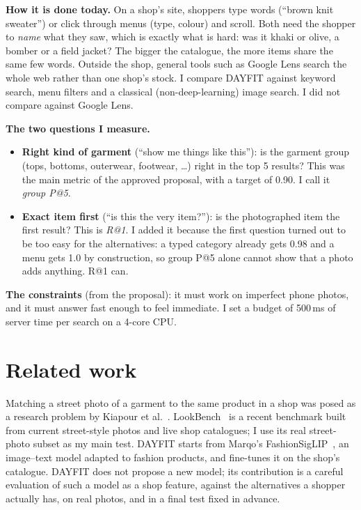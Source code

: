 \documentclass[11pt,a4paper]{article}
\begin{document}
\textbf{How it is done today.} On a shop's site, shoppers type words (``brown knit sweater'') or click
through menus (type, colour) and scroll. Both need the shopper to \emph{name} what they saw, which is exactly
what is hard: was it khaki or olive, a bomber or a field jacket? The bigger the catalogue, the more items share
the same few words. Outside the shop, general tools such as Google Lens search the whole web rather than one
shop's stock. I compare DAYFIT against keyword search, menu filters and a classical (non-deep-learning)
image search. I did not compare against Google Lens.

\textbf{The two questions I measure.}
\begin{itemize}
\item \textbf{Right kind of garment} (``show me things like this''): is the garment group (tops, bottoms,
  outerwear, footwear, \dots) right in the top 5 results? This was the main metric of the approved proposal,
  with a target of 0.90. I call it \emph{group P@5}.
\item \textbf{Exact item first} (``is this the very item?''): is the photographed item the first result?
  This is \emph{R@1}. I added it because the first question turned out to be too easy for the alternatives:
  a typed category already gets 0.98 and a menu gets 1.0 by construction, so group P@5 alone cannot show that
  a photo adds anything. R@1 can.
\end{itemize}

\textbf{The constraints} (from the proposal): it must work on imperfect phone photos, and it must answer fast
enough to feel immediate. I set a budget of 500\,ms of server time per search on a 4-core CPU.

\section{Related work}

Matching a street photo of a garment to the same product in a shop was posed as a research problem by
Kiapour et al.~\cite{kiapour2015}. LookBench~\cite{lookbench} is a recent benchmark built from current
street-style photos and live shop catalogues; I use its real street-photo subset as my main test. DAYFIT
starts from Marqo's FashionSigLIP~\cite{marqo2024}, an image--text model adapted to fashion products, and
fine-tunes it on the shop's catalogue. DAYFIT does not propose a new model; its contribution is a careful
evaluation of such a model as a shop feature, against the alternatives a shopper actually has, on real
photos, and in a final test fixed in advance.
\end{document}
